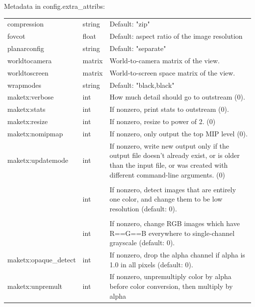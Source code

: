 \noindent Metadata in {\cf config.extra_attribs}:

\begin{longtable}{ >{\spc \cf\small}p{1.8in} >{\cf\small}l p{3in}}
   compression & string &   Default: "zip" \\
   fovcot & float &          Default: aspect ratio of the image resolution \\
   planarconfig & string &  Default: "separate" \\
   worldtocamera & matrix &  World-to-camera matrix of the view. \\
   worldtoscreen & matrix &  World-to-screen space matrix of the view. \\
   wrapmodes & string &     Default: "black,black" \\
   maketx:verbose & int &    How much detail should go to outstream (0). \\
   maketx:stats & int &      If nonzero, print stats to outstream (0). \\
   maketx:resize & int &     If nonzero, resize to power of 2. (0) \\
   maketx:nomipmap & int &   If nonzero, only output the top MIP level (0). \\
   maketx:updatemode & int &  If nonzero, write new output only if the
                             output file doesn't already exist, or is
                             older than the input file, or was created with
                             different command-line arguments. (0) \\
   \multicolumn{2}{l}{\spc \cf\small maketx:constant_color_detect} \\  & int &
                          If nonzero, detect images that are entirely
                            one color, and change them to be low
                            resolution (default: 0). \\
   \multicolumn{2}{l}{\spc \cf\small maketx:monochrome_detect} \\ & int &
                          If nonzero, change RGB images which have
                             R==G==B everywhere to single-channel
                             grayscale (default: 0). \\
   maketx:opaque_detect & int &
                          If nonzero, drop the alpha channel if alpha
                             is 1.0 in all pixels (default: 0). \\
   maketx:unpremult & int &  If nonzero, unpremultiply color by alpha before
                             color conversion, then multiply by alpha

\end{longtable}
